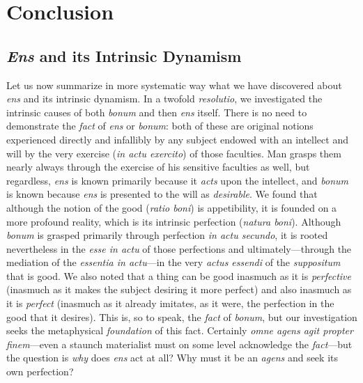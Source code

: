 
\chapter{Conclusion}
\label{chap:conclusion}

\section{\emph{Ens} and its Intrinsic Dynamism}

Let us now summarize in more systematic way what we have discovered about \emph{ens} and its intrinsic dynamism. In a twofold \emph{resolutio}, we investigated the intrinsic causes of both \emph{bonum} and then \emph{ens} itself. There is no need to demonstrate the \emph{fact} of \emph{ens} or \emph{bonum}: both of these are original notions experienced directly and infallibly by any subject endowed with an intellect and will by the very exercise (\emph{in actu exercito}) of those faculties. Man grasps them nearly always through the exercise of his sensitive faculties as well, but regardless, \emph{ens} is known primarily because it \emph{acts} upon the intellect, and \emph{bonum} is known because \emph{ens} is presented to the will as \emph{desirable}. We found that although the notion of the good (\emph{ratio boni}) is appetibility, it is founded on a more profound reality, which is its intrinsic perfection (\emph{natura boni}).  Although \emph{bonum} is grasped primarily through perfection \emph{in actu secundo}, it is rooted nevertheless in the \emph{esse in actu} of those perfections and ultimately---through the mediation of the \emph{essentia in actu}---in the very \emph{actus essendi} of the \emph{suppositum} that is good. We also noted that a thing can be good inasmuch as it is 	\emph{perfective} (inasmuch as it makes the subject desiring it more perfect) and also inasmuch as it is \emph{perfect} (inasmuch as it already imitates, as it were, the perfection in the good that it desires). This is, so to speak, the \emph{fact} of \emph{bonum}, but our investigation seeks the metaphysical \emph{foundation} of this fact. Certainly \emph{omne agens agit propter finem}---even a staunch materialist must on some level acknowledge the \emph{fact}---but the question is \emph{why} does \emph{ens} act at all? Why must it be an \emph{agens} and seek its own perfection?

